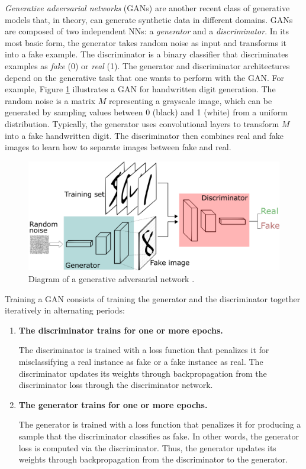 \textit{Generative adversarial networks} (GANs) \cite{goodfellow2014generative} are another recent class of generative models that, in theory, can generate synthetic data in different domains. GANs are composed of two independent NNs: a \textit{generator} and a \textit{discriminator}. In its most basic form, the generator takes random noise as input and transforms it into a fake example. The discriminator is a binary classifier that discriminates examples as \textit{fake} (0) or \textit{real} (1). The generator and discriminator architectures depend on the generative task that one wants to perform with the GAN. For example, Figure \ref{fig:gan} illustrates a GAN for handwritten digit generation. The random noise is a matrix $M$ representing a grayscale image, which can be generated by sampling values between 0 (black) and 1 (white) from a uniform distribution. Typically, the generator uses convolutional layers to transform $M$ into a fake handwritten digit. The discriminator then combines real and fake images to learn how to separate images between fake and real.

\begin{figure}[!h]
 \centering
 \includegraphics[width=\columnwidth]{imgs/background/gan.png}
 \caption{Diagram of a generative adversarial network \cite{silva2018intuitive}.}
 \label{fig:gan}
\end{figure}

Training a GAN consists of training the generator and the discriminator together
iteratively in alternating periods:

\begin{enumerate}
    \item \textbf{The discriminator trains for one or more epochs.}

    The discriminator is trained with a loss function that penalizes it for misclassifying a real instance as fake or a fake instance as real. The discriminator updates its weights through backpropagation from the discriminator loss through the discriminator network.

    \item \textbf{The generator trains for one or more epochs.}

    The generator is trained with a loss function that penalizes it for producing a sample that the discriminator  classifies as fake. In other words, the generator loss is computed via the discriminator. Thus, the generator updates its weights through backpropagation from the discriminator to the generator.
\end{enumerate}

